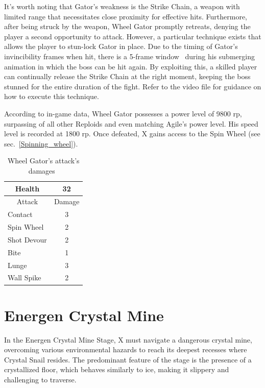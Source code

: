 It's worth noting that Gator's weakness is the Strike Chain, a weapon with limited range that necessitates close proximity for effective hits. Furthermore, after being struck by the weapon, Wheel Gator promptly retreats, denying the player a second opportunity to attack. However, a particular technique exists that allows the player to stun-lock Gator in place. Due to the timing of Gator's invincibility frames when hit, there is a 5-frame window~\cite{rta:x2} during his submerging animation in which the boss can be hit again. By exploiting this, a skilled player can continually release the Strike Chain at the right moment, keeping the boss stunned for the entire duration of the fight. Refer to the video file  for guidance on how to execute this technique.

According to in-game data, Wheel Gator possesses a power level of 9800 rp, surpassing  of all other Reploids and even matching Agile's power level. His speed level is recorded at 1800 rp. Once defeated, X gains access to the Spin Wheel (see sec.~\ref{Spinning_wheel}). 

\begin{table}[htp]
	\centering
	\begin{tabular}[h]{l c}
		\toprule
		\multicolumn{1}{c}{Health}  & 32 \\
		\midrule
		\multicolumn{1}{c}{Attack} & \multicolumn{1}{c}{Damage}\\
		Contact & 3 \\
		Spin Wheel & 2\\
		Shot Devour & 2\\
		Bite & 1\\
		Lunge& 3\\
		Wall Spike& 2\\
		\bottomrule
	\end{tabular}
	\caption{Wheel Gator's attack's damages~\cite{wiki:Wheel_gator}}
\end{table}

\section{Energen Crystal Mine}
In the Energen Crystal Mine Stage, X must navigate a dangerous crystal mine, overcoming various environmental hazards to reach its deepest recesses where Crystal Snail resides. The predominant feature of the stage is the presence of a crystallized floor, which behaves similarly to ice, making it slippery and challenging to traverse.


